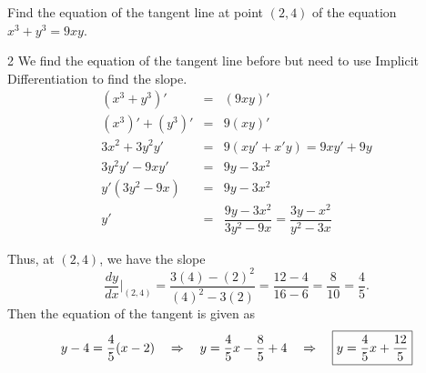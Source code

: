 \documentclass{book}
\begin{document}
\begin{Exam} Find the equation of the tangent line at point $(2,4)$ of the equation $x^3 + y^3 = 9xy$.\vspace{0.3 in}
\begin{multicols}{2}
We find the equation of the tangent line before but need to use Implicit Differentiation to find the slope.
\begin{eqnarray*}
(x^3 + y^3)' &=& (9xy)'\\
(x^3)' + (y^3)' &=& 9(xy)'\\
3x^2 + 3y^2y' &=& 9(xy' + x'y) =9xy' + 9y\\
 3y^2y' - 9xy' &=& 9y - 3x^2\\
 y'(3y^2 - 9x) &=& 9y-3x^2\\
y' &=& \dfrac{9y-3x^2}{3y^2-9x} = \dfrac{3y-x^2}{y^2-3x}
\end{eqnarray*}

\begin{center}
\end{center}
\end{multicols}
Thus, at $(2,4)$, we have the slope \[\dfrac{dy}{dx}\bigg\vert_{(2,4)} = \dfrac{3(4)-(2)^2}{(4)^2-3(2)} = \dfrac{12 - 4}{16 - 6} = \dfrac{8}{10} = \dfrac{4}{5}.\] 
Then the equation of the tangent is given as 
\[ y-4 = \dfrac{4}{5}(x- 2) \quad\Rightarrow\quad y = \dfrac{4}{5}x - \dfrac{8}{5} + 4 \quad\Rightarrow\quad \fbox{$y = \dfrac{4}{5}x + \dfrac{12}{5}$} \]
\end{Exam}\vs
\end{document}
